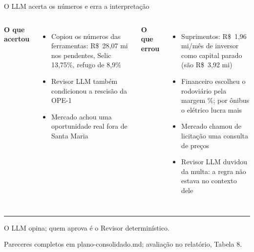 \documentclass[aspectratio=169,11pt]{beamer}
\newcommand{\nota}[1]{{\small\color{muted}#1}}
\begin{document}
\begin{frame}{O LLM acerta os números e erra a interpretação}
\small
\begin{columns}[T]
\textbf{O que acertou}
\begin{itemize}
  \item Copiou os números das ferramentas: R\$~28,07 mi nos pendentes, Selic 13,75\%, refugo de 8,9\%
  \item Revisor LLM também condicionou a rescisão da OPE-1
  \item Mercado achou uma oportunidade real fora de Santa Maria
\end{itemize}
\textbf{O que errou}
\begin{itemize}
  \item Suprimentos: R\$~1,96 mi/mês de inversor como capital parado (são R\$~3,92 mi)
  \item Financeiro escolheu o rodoviário pela margem \%; por ônibus o elétrico lucra mais
  \item Mercado chamou de licitação uma consulta de preços
  \item Revisor LLM duvidou da multa: a regra não estava no contexto dele
\end{itemize}
\end{columns}
\vspace{2mm}
\hrule\vspace{2mm}
O LLM opina; quem aprova é o Revisor determinístico.

\nota{Pareceres completos em plano-consolidado.md; avaliação no relatório, Tabela 8.}
\end{frame}
\end{document}
